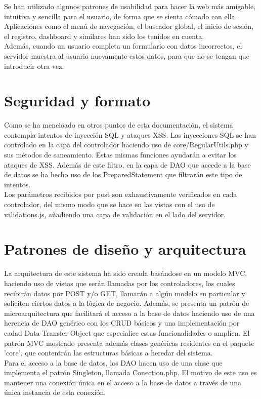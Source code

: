 Se han utilizado algunos patrones de usabilidad para hacer la web 
m\'{a}s amigable, intuitiva y sencilla para el usuario, de forma que se sienta c\'{o}modo con ella.
Aplicaciones como el men\'{u} de navegaci\'{o}n, el buscador global, el inicio de sesi\'{o}n, el registro,
dashboard y similares han sido los tenidos en cuenta.\\

Adem\'{a}s, cuando un usuario completa un formulario con datos incorrectos, el servidor 
muestra al usuario nuevamente estos datos, para que no se tengan que introducir otra vez.


\section{Seguridad y formato}

Como se ha mencioado en otros puntos de esta documentaci\'{o}n, el sistema contempla intentos de inyecci\'{o}n SQL y ataques XSS.
Las inyecciones SQL se han controlado en la capa del controlador haciendo uso de core/RegularUtils.php y sus m\'{e}todos de saneamiento.
Estas mismas funciones ayudar\'{a}n a evitar los ataques de XSS. Adem\'{a}s de este filtro, en la capa de DAO que accede a la base de datos
se ha hecho uso de los PreparedStatement que filtrar\'{a}n este tipo de intentos.\\

Los par\'{a}metros recibidos por post son exhaustivamente verificados en cada controlador, del mismo modo que se hace en las vistas con el uso
de validations.js, a\~{n}adiendo una capa de validaci\'{o}n en el lado del servidor.


\section{Patrones de dise\~{n}o y arquitectura}
La arquitectura de este sistema ha sido creada bas\'{a}ndose en un modelo MVC, haciendo uso de vistas que ser\'{a}n llamadas
por los controladores, los cuales recibir\'{a}n datos por POST y/o GET, llamar\'{a}n a alg\'{u}n modelo en particular y soliciten ciertos
datos a la l\'{o}gica de negocio. Adem\'{a}s, se presenta un patr\'{o}n de microarquitectura que facilitar\'{a} el acceso a la base de datos haciendo uso
de una herencia de DAO gen\'{e}rico con los CRUD b\'{a}sicos y una implementaci\'{o}n por cadad Data Transfer Object que especialice estas funcionalidades 
o ampl\'{i}en. El patr\'{o}n MVC mostrado presenta adem\'{a}s clases gen\'{e}ricas residentes en el paquete 'core',
que contentr\'{a}n las estructuras b\'{a}sicas a heredar del sistema. \\

Para el acceso a la base de datos, los DAO hacen uso de una clase que implementa el patr\'{o}n Singleton, llamada Conection.php. El motivo de este uso 
es mantener una conexi\'{o}n \'{u}nica en el acceso a la base de datos a trav\'{e}s de una \'{u}nica instancia de esta conexi\'{o}n.


